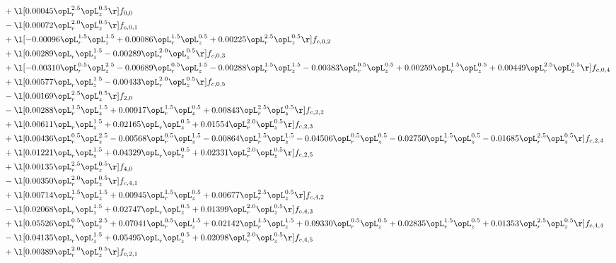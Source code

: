 \begin{alignat}{2}
& + \l[  0.00045 \opL_r^{2.5} \opL_z^{0.5}  \r] f_{0,0} \nonumber \\ 
& - \l[  0.00072 \opL_r^{2.0} \opL_z^{0.5}  \r] f_{c,0,1} \nonumber \\ 
& + \l[  -0.00096 \opL_r^{1.5} \opL_z^{1.5} +  0.00086 \opL_r^{1.5} \opL_z^{0.5} +  0.00225 \opL_r^{2.5} \opL_z^{0.5}  \r] f_{c,0,2} \nonumber \\ 
& + \l[  0.00289 \opL_r \opL_z^{1.5}   -0.00289 \opL_r^{2.0} \opL_z^{0.5}  \r] f_{c,0,3} \nonumber \\ 
& + \l[  -0.00310 \opL_r^{0.5} \opL_z^{2.5}   -0.00689 \opL_r^{0.5} \opL_z^{1.5}   -0.00288 \opL_r^{1.5} \opL_z^{1.5}   -0.00383 \opL_r^{0.5} \opL_z^{0.5} +  0.00259 \opL_r^{1.5} \opL_z^{0.5} +  0.00449 \opL_r^{2.5} \opL_z^{0.5}  \r] f_{c,0,4} \nonumber \\ 
& + \l[  0.00577 \opL_r \opL_z^{1.5}   -0.00433 \opL_r^{2.0} \opL_z^{0.5}  \r] f_{c,0,5} \nonumber \\ 
& - \l[  0.00169 \opL_r^{2.5} \opL_z^{0.5}  \r] f_{2,0} \nonumber \\ 
& - \l[  0.00288 \opL_r^{1.5} \opL_z^{1.5} +  0.00917 \opL_r^{1.5} \opL_z^{0.5} +  0.00843 \opL_r^{2.5} \opL_z^{0.5}  \r] f_{c,2,2} \nonumber \\ 
& + \l[  0.00611 \opL_r \opL_z^{1.5} +  0.02165 \opL_r \opL_z^{0.5} +  0.01554 \opL_r^{2.0} \opL_z^{0.5}  \r] f_{c,2,3} \nonumber \\ 
& + \l[  0.00436 \opL_r^{0.5} \opL_z^{2.5}   -0.00568 \opL_r^{0.5} \opL_z^{1.5}   -0.00864 \opL_r^{1.5} \opL_z^{1.5}   -0.04506 \opL_r^{0.5} \opL_z^{0.5}   -0.02750 \opL_r^{1.5} \opL_z^{0.5}   -0.01685 \opL_r^{2.5} \opL_z^{0.5}  \r] f_{c,2,4} \nonumber \\ 
& + \l[  0.01221 \opL_r \opL_z^{1.5} +  0.04329 \opL_r \opL_z^{0.5} +  0.02331 \opL_r^{2.0} \opL_z^{0.5}  \r] f_{c,2,5} \nonumber \\ 
& + \l[  0.00135 \opL_r^{2.5} \opL_z^{0.5}  \r] f_{4,0} \nonumber \\ 
& - \l[  0.00350 \opL_r^{2.0} \opL_z^{0.5}  \r] f_{c,4,1} \nonumber \\ 
& + \l[  0.00714 \opL_r^{1.5} \opL_z^{1.5} +  0.00945 \opL_r^{1.5} \opL_z^{0.5} +  0.00677 \opL_r^{2.5} \opL_z^{0.5}  \r] f_{c,4,2} \nonumber \\ 
& - \l[  0.02068 \opL_r \opL_z^{1.5} +  0.02747 \opL_r \opL_z^{0.5} +  0.01399 \opL_r^{2.0} \opL_z^{0.5}  \r] f_{c,4,3} \nonumber \\ 
& + \l[  0.05526 \opL_r^{0.5} \opL_z^{2.5} +  0.07041 \opL_r^{0.5} \opL_z^{1.5} +  0.02142 \opL_r^{1.5} \opL_z^{1.5} +  0.09330 \opL_r^{0.5} \opL_z^{0.5} +  0.02835 \opL_r^{1.5} \opL_z^{0.5} +  0.01353 \opL_r^{2.5} \opL_z^{0.5}  \r] f_{c,4,4} \nonumber \\ 
& - \l[  0.04135 \opL_r \opL_z^{1.5} +  0.05495 \opL_r \opL_z^{0.5} +  0.02098 \opL_r^{2.0} \opL_z^{0.5}  \r] f_{c,4,5} \nonumber \\ 
& + \l[  0.00389 \opL_r^{2.0} \opL_z^{0.5}  \r] f_{c,2,1} \nonumber \\ 
\end{alignat} 


